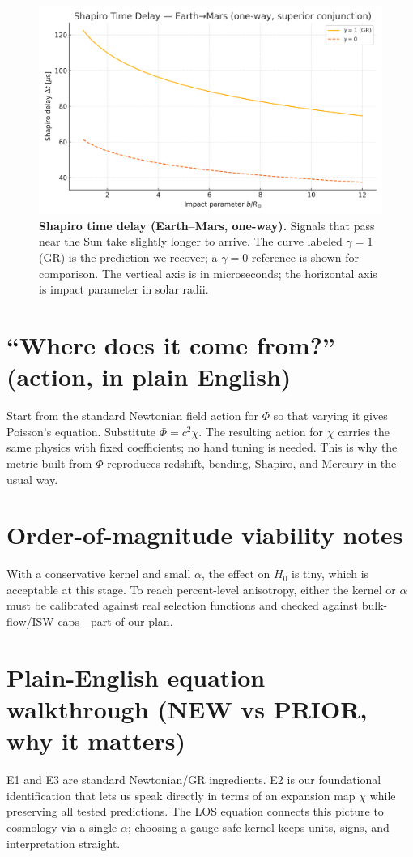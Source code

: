\documentclass[11pt]{article}
\begin{document}
\begin{figure}[h]\centering
\includegraphics[width=0.82\linewidth]{shapiro_curves.png}
\caption{\textbf{Shapiro time delay (Earth–Mars, one-way).} Signals that pass near the Sun take slightly longer to arrive. The curve labeled $\gamma=1$ (GR) is the prediction we recover; a $\gamma=0$ reference is shown for comparison. The vertical axis is in microseconds; the horizontal axis is impact parameter in solar radii.}
\end{figure}

\section*{“Where does it come from?” (action, in plain English)}
Start from the standard Newtonian field action for $\Phi$ so that varying it gives Poisson’s equation. Substitute $\Phi=c^{2}\chi$. The resulting action for $\chi$ carries the same physics with fixed coefficients; no hand tuning is needed. This is why the metric built from $\Phi$ reproduces redshift, bending, Shapiro, and Mercury in the usual way.

\section*{Order-of-magnitude viability notes}
With a conservative kernel and small $\alpha$, the effect on $H_0$ is tiny, which is acceptable at this stage. To reach percent-level anisotropy, either the kernel or $\alpha$ must be calibrated against real selection functions and checked against bulk-flow/ISW caps—part of our plan.

\section*{Plain-English equation walkthrough (NEW vs PRIOR, why it matters)}
E1 and E3 are standard Newtonian/GR ingredients. E2 is our foundational identification that lets us speak directly in terms of an expansion map $\chi$ while preserving all tested predictions. The LOS equation connects this picture to cosmology via a single $\alpha$; choosing a gauge-safe kernel keeps units, signs, and interpretation straight.
\end{document}
